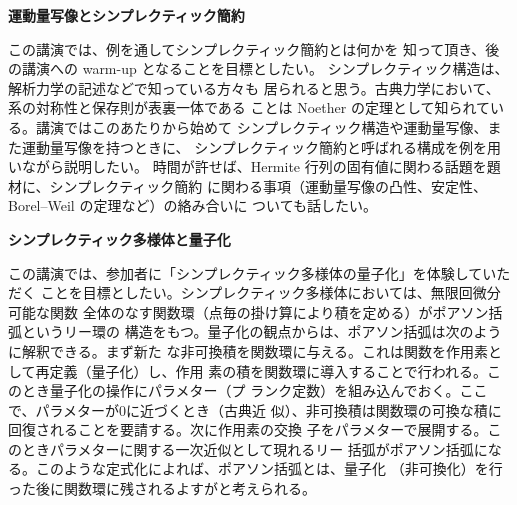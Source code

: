 \documentclass[uplatex,dvipdfmx]{jlreq}
\begin{document}
\begin{center}
{\large\bfseries 運動量写像とシンプレクティック簡約}\\[6pt]
\hspace*{\fill}{\large\bfseries 小野　薫（北大・理）}
\end{center}
\vspace{1pc}

この講演では、例を通してシンプレクティック簡約とは何かを
知って頂き、後の講演への warm-up となることを目標としたい。
シンプレクティック構造は、解析力学の記述などで知っている方々も
居られると思う。古典力学において、系の対称性と保存則が表裏一体である
ことは Noether の定理として知られている。講演ではこのあたりから始めて
シンプレクティック構造や運動量写像、また運動量写像を持つときに、
シンプレクティック簡約と呼ばれる構成を例を用いながら説明したい。
時間が許せば、Hermite 行列の固有値に関わる話題を題材に、シンプレクティック簡約
に関わる事項（運動量写像の凸性、安定性、Borel--Weil の定理など）の絡み合いに
ついても話したい。

\newpage

\begin{center}
{\large\bfseries シンプレクティック多様体と量子化}\\[6pt]
\hspace*{\fill}{\large\bfseries 森吉　仁志（慶応大・理工）}
\end{center}
\vspace{1pc}

この講演では、参加者に「シンプレクティック多様体の量子化」を体験していただく
ことを目標としたい。シンプレクティック多様体においては、無限回微分可能な関数
全体のなす関数環（点毎の掛け算により積を定める）がポアソン括弧というリー環の
構造をもつ。量子化の観点からは、ポアソン括弧は次のように解釈できる。まず新た
な非可換積を関数環に与える。これは関数を作用素として再定義（量子化）し、作用
素の積を関数環に導入することで行われる。このとき量子化の操作にパラメター（プ
ランク定数）を組み込んでおく。ここで、パラメターが0に近づくとき（古典近
似）、非可換積は関数環の可換な積に回復されることを要請する。次に作用素の交換
子をパラメターで展開する。このときパラメターに関する一次近似として現れるリー
括弧がポアソン括弧になる。このような定式化によれば、ポアソン括弧とは、量子化
（非可換化）を行った後に関数環に残されるよすがと考えられる。
\end{document}
